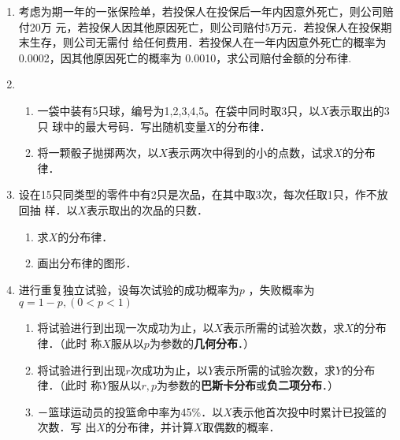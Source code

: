 \documentclass[10pt,a4paper]{article}
\begin{document}
\begin{enumerate}

        

    
    \item 考虑为期一年的一张保险单，若投保人在投保后一年内因意外死亡，则公司赔付20万
    元，若投保人因其他原因死亡，则公司赔付5万元．若投保人在投保期末生存，则公司无需付
    给任何费用．若投保人在一年内因意外死亡的概率为0.0002，因其他原因死亡的概率为
    0.0010，求公司赔付金额的分布律.


    \item \begin{enumerate}
        \item 一袋中装有5只球，编号为1,2,3,4,5。在袋中同时取3只，以$X$表示取出的3只
        球中的最大号码．写出随机变量$X$的分布律．
        \item 将一颗骰子抛掷两次，以$X$表示两次中得到的小的点数，试求$X$的分布律．
    \end{enumerate}


    \item 设在15只同类型的零件中有2只是次品，在其中取3次，每次任取1只，作不放回抽
    样．以$X$表示取出的次品的只数．
    \begin{enumerate}
        \item 求$X$的分布律．
        \item 画出分布律的图形．
    \end{enumerate}



    \item 进行重复独立试验，设每次试验的成功概率为$p$ ，失败概率为$q=1-p,(0<p<1)$
    \begin{enumerate}
        \item 将试验进行到出现一次成功为止，以$X$表示所需的试验次数，求$X$的分布律．（此时
        称$X$服从以$p$为参数的\textbf{几何分布}．）
        \item 将试验进行到出现$r$次成功为止，以$Y$表示所需的试验次数，求$Y$的分布律．（此时
        称$Y$服从以$r,p$为参数的\textbf{巴斯卡分布}或\textbf{负二项分布}．）
        \item －篮球运动员的投篮命中率为45\%．以$X$表示他首次投中时累计已投篮的次数．写
        出$X$的分布律，并计算$X$取偶数的概率．
    \end{enumerate}



\end{enumerate}
\end{document}
